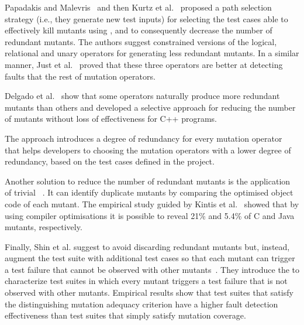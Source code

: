 Papadakis and Malevris~\cite{papadakis2012mutation} and then Kurtz et al.~\cite{kurtz2015static} proposed a path selection strategy (i.e., they generate new test inputs) for selecting the test cases able to effectively kill mutants using , and to consequently decrease the number of redundant mutants. 
The authors suggest constrained versions of the logical, relational and unary operators for generating less redundant mutants. 
In a similar manner, Just et al.~\cite{just2012redundant,just2015higher} proved that these three operators are better at detecting faults that the rest of mutation operators.

Delgado et al.~\cite{delgado2017assessment} show that some operators naturally produce more redundant mutants than others and
developed a selective approach for reducing the number of mutants without loss of effectiveness for C++ programs. 

The approach introduces a degree of redundancy for every mutation operator that helps developers to choosing the mutation operators with a lower degree of redundancy, based on the test cases defined in the project.

Another solution to reduce the number of redundant mutants is the application of trivial ~\cite{papadakis2015trivial, kintis2017detecting,papadakis2019mutation}. 
It can identify duplicate mutants by comparing the optimised object code of each mutant. The empirical study guided by Kintis et al.~\cite{kintis2017detecting} showed that by using compiler optimisations it is possible to reveal 21\% and 5.4\% of C and Java mutants, respectively.


Finally, Shin et al. suggest to avoid discarding redundant mutants but, instead, augment the test suite with additional test cases so that 
each mutant can trigger a test failure that cannot be observed with other mutants~\cite{Shin:TSE:DCriterion:2018}. 
They introduce the  to characterize test suites in which every mutant triggers a test failure that is not observed with other mutants.
Empirical results show that test suites that satisfy the distinguishing mutation adequacy criterion have a higher
 fault detection effectiveness than test suites that simply satisfy mutation coverage.



